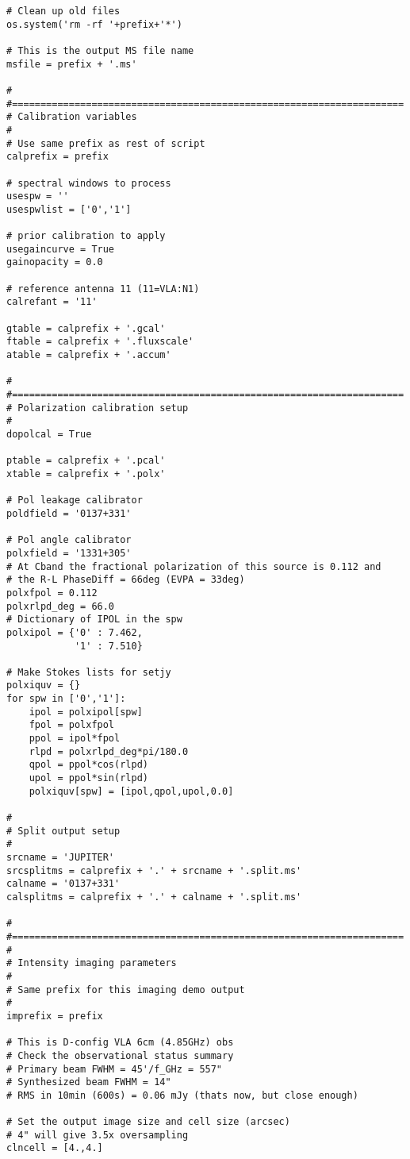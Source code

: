 \begin{verbatim}
# Clean up old files
os.system('rm -rf '+prefix+'*')

# This is the output MS file name
msfile = prefix + '.ms'

#
#=====================================================================
# Calibration variables
#
# Use same prefix as rest of script
calprefix = prefix

# spectral windows to process
usespw = ''
usespwlist = ['0','1']

# prior calibration to apply
usegaincurve = True
gainopacity = 0.0

# reference antenna 11 (11=VLA:N1)
calrefant = '11'

gtable = calprefix + '.gcal'
ftable = calprefix + '.fluxscale'
atable = calprefix + '.accum'

#
#=====================================================================
# Polarization calibration setup
#
dopolcal = True

ptable = calprefix + '.pcal'
xtable = calprefix + '.polx'

# Pol leakage calibrator
poldfield = '0137+331'

# Pol angle calibrator
polxfield = '1331+305'
# At Cband the fractional polarization of this source is 0.112 and
# the R-L PhaseDiff = 66deg (EVPA = 33deg)
polxfpol = 0.112
polxrlpd_deg = 66.0
# Dictionary of IPOL in the spw
polxipol = {'0' : 7.462,
            '1' : 7.510}

# Make Stokes lists for setjy
polxiquv = {}
for spw in ['0','1']:
    ipol = polxipol[spw]
    fpol = polxfpol
    ppol = ipol*fpol
    rlpd = polxrlpd_deg*pi/180.0
    qpol = ppol*cos(rlpd)
    upol = ppol*sin(rlpd)
    polxiquv[spw] = [ipol,qpol,upol,0.0]

#
# Split output setup
#
srcname = 'JUPITER'
srcsplitms = calprefix + '.' + srcname + '.split.ms'
calname = '0137+331'
calsplitms = calprefix + '.' + calname + '.split.ms'

#
#=====================================================================
#
# Intensity imaging parameters
#
# Same prefix for this imaging demo output
#
imprefix = prefix

# This is D-config VLA 6cm (4.85GHz) obs
# Check the observational status summary
# Primary beam FWHM = 45'/f_GHz = 557"
# Synthesized beam FWHM = 14"
# RMS in 10min (600s) = 0.06 mJy (thats now, but close enough)

# Set the output image size and cell size (arcsec)
# 4" will give 3.5x oversampling
clncell = [4.,4.]


\end{verbatim}
